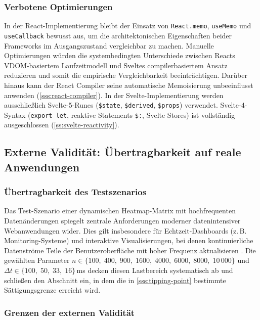 \subsubsection{Verbotene Optimierungen}
\label{sss:forbidden-optimizations}

In der React-Implementierung bleibt der Einsatz von \texttt{React.memo}, \texttt{useMemo} und \texttt{useCallback} bewusst aus, um die architektonischen Eigenschaften beider Frameworks im Ausgangszustand vergleichbar zu machen. Manuelle Optimierungen würden die systembedingten Unterschiede zwischen Reacts VDOM-basiertem Laufzeitmodell und Sveltes compilerbasiertem Ansatz reduzieren und somit die empirische Vergleichbarkeit beeinträchtigen. Darüber hinaus kann der React Compiler seine automatische Memoisierung unbeeinflusst anwenden (\cref{sss:react-compiler}). In der Svelte-Implementierung werden ausschließlich Svelte-5-Runes (\texttt{\$state}, \texttt{\$derived}, \texttt{\$props}) verwendet. Svelte-4-Syntax (\texttt{export let}, reaktive Statements \texttt{\$:}, Svelte Stores) ist vollständig ausgeschlossen (\cref{ss:svelte-reactivity}).

\subsection{Externe Validität: Übertragbarkeit auf reale Anwendungen}
\label{ss:external-validity}

\subsubsection{Übertragbarkeit des Testszenarios}
\label{sss:transferability}

Das Test-Szenario einer dynamischen Heatmap-Matrix mit hochfrequenten Datenänderungen spiegelt zentrale Anforderungen moderner datenintensiver Webanwendungen wider. Dies gilt insbesondere für Echtzeit-Dashboards (z.\,B. Monitoring-Systeme) und interaktive Visualisierungen, bei denen kontinuierliche Datenströme Teile der Benutzeroberfläche mit hoher Frequenz aktualisieren \cite{furrer-livedashboard-2018}. Die gewählten Parameter $n \in \{100,\;400,\;900,\;1600,\;4000,\;6000,\;8000,\;10\,000\}$ und $\Delta t \in \{100,\;50,\;33,\;16\}$\,ms decken diesen Lastbereich systematisch ab und schließen den Abschnitt ein, in dem die in \cref{sss:tipping-point} bestimmte Sättigungsgrenze erreicht wird.               

\subsubsection{Grenzen der externen Validität}
\label{sss:external-validity-limits}

